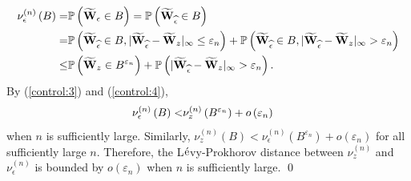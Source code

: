 \documentclass{amsart}
\begin{document}
\begin{align}\label{control:4}
\nu_{\epsilon}^{(n)}\left(B\right) =& \mathbb{P}\left(\widetilde{\mathbf{W}}_{\epsilon}\in B\right)=\mathbb{P}\left(\widetilde{\mathbf{W}}_{\widehat{\epsilon}}\in B\right)
\\\notag=&
\mathbb{P}\left(\widetilde{\mathbf{W}}_{\widehat{\epsilon}}\in B, |\widetilde{\mathbf{W}}_{\widehat{\epsilon}}-\widetilde{\mathbf{W}}_{z}|_{\infty}\leq \varepsilon_{n}\right)
+
\mathbb{P}\left(\widetilde{\mathbf{W}}_{\widehat{\epsilon}}\in B, |\widetilde{\mathbf{W}}_{\widehat{\epsilon}}-\widetilde{\mathbf{W}}_{z}|_{\infty}> \varepsilon_{n}\right)
\\\notag\leq&
\mathbb{P}\left(\widetilde{\mathbf{W}}_{z}\in B^{\varepsilon_{n}}\right)
+\mathbb{P}\left( |\widetilde{\mathbf{W}}_{\widehat{\epsilon}}-\widetilde{\mathbf{W}}_{z}|_{\infty}> \varepsilon_{n}\right).
\end{align}
By (\ref{control:3}) and (\ref{control:4}),
\begin{align}\notag
\nu_{\epsilon}^{(n)}\left(B\right) <&
\nu_{z}^{(n)}\left(B^{\varepsilon_{n}}\right)+ o\left(\varepsilon_{n}\right)
\end{align}
when $n$ is sufficiently large. Similarly,
$
\nu_{z}^{(n)}\left(B\right) <
\nu_{\epsilon}^{(n)}\left(B^{\varepsilon_{n}}\right)+ o\left(\varepsilon_{n}\right)
$
for all sufficiently large $n$.
Therefore,
the L$\acute{\textup{e}}$vy-Prokhorov distance between $\nu_{z}^{(n)}$ and $\nu_{\epsilon}^{(n)}$
is bounded by $o\left(\varepsilon_{n}\right)$ when $n$ is sufficiently large.
\qed
\end{document}
